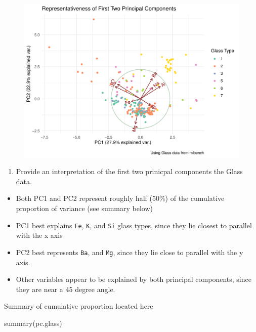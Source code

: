 \documentclass[
  letterpaper,
  DIV=11,
  numbers=noendperiod]{scrartcl}
\newenvironment{Shaded}{}{}
\newcommand{\FunctionTok}[1]{\textcolor[rgb]{0.44,0.26,0.76}{#1}}
\newcommand{\NormalTok}[1]{\textcolor[rgb]{0.14,0.16,0.18}{#1}}
\providecommand{\tightlist}{%
  \setlength{\itemsep}{0pt}\setlength{\parskip}{0pt}}\usepackage{longtable,booktabs,array}
\begin{document}
\begin{figure}[H]

{\centering \includegraphics{Carpenter-HW3_files/figure-pdf/unnamed-chunk-20-1.pdf}

}

\end{figure}

\begin{enumerate}
\def\labelenumi{\roman{enumi}.}
\setcounter{enumi}{2}
\tightlist
\item
  Provide an interpretation of the first two prinicpal components the
  Glass data.
\end{enumerate}

\begin{itemize}
\item
  Both PC1 and PC2 represent roughly half (50\%) of the cumulative
  proportion of variance (see summary below)
\item
  PC1 best explains \texttt{Fe}, \texttt{K}, and \texttt{Si} glass
  types, since they lie closest to parallel with the x axis
\item
  PC2 best represents \texttt{Ba}, and \texttt{Mg}, since they lie close
  to parallel with the y axis.
\item
  Other variables appear to be explained by both principal components,
  since they are near a 45 degree angle.
\end{itemize}

Summary of cumulative proportion located here

\begin{Shaded}
\begin{Highlighting}[]
\FunctionTok{summary}\NormalTok{(pc.glass)}
\end{Highlighting}
\end{Shaded}
\end{document}
